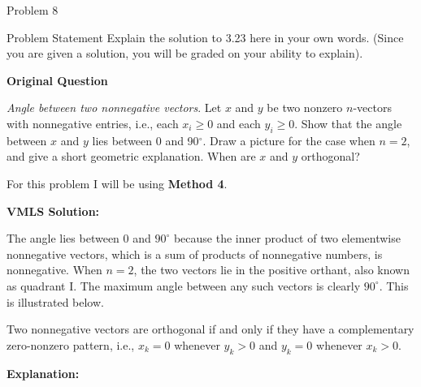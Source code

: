 \begin{problem}{Problem 8}
    \begin{statement}{Problem Statement}
        Explain the solution to 3.23 here in your own words. (Since you are given a solution, you will be graded on your ability to explain). \vspace*{1em}

        \textbf{Original Question} \vspace*{1em}

        \textit{Angle between two nonnegative vectors}. Let $x$ and $y$ be two nonzero $n$-vectors with nonnegative entries, i.e., each $x_{i} \geq 0$ and each $y_{i} \geq 0$. Show that the angle between
        $x$ and $y$ lies between 0 and 90$^{\circ}$. Draw a picture for the case when $n = 2$, and give a short geometric explanation. When are $x$ and $y$ orthogonal?
    \end{statement}

    \begin{Highlight}[Solution]
        For this problem I will be using \textbf{Method 4}. \vspace*{1em}

        \textbf{VMLS Solution:} \vspace*{1em}

        The angle lies between 0 and $90^{\circ}$ because the inner product of two elementwise nonnegative vectors, which is a sum of products of nonnegative numbers, is nonnegative. When $n = 2$, the two 
        vectors lie in the positive orthant, also known as quadrant I. The maximum angle between any such vectors is clearly $90^{\circ}$. This is illustrated below.

        \begin{center}
        \end{center}
        Two nonnegative vectors are orthogonal if and only if they have a complementary zero-nonzero pattern, i.e., $x_{k} = 0$ whenever $y_{k} > 0$ and $y_{k} = 0$ whenever $x_{k} > 0$. \vspace*{1em}

        \textbf{Explanation:} \vspace*{1em}


\end{Highlight}
\end{problem}
